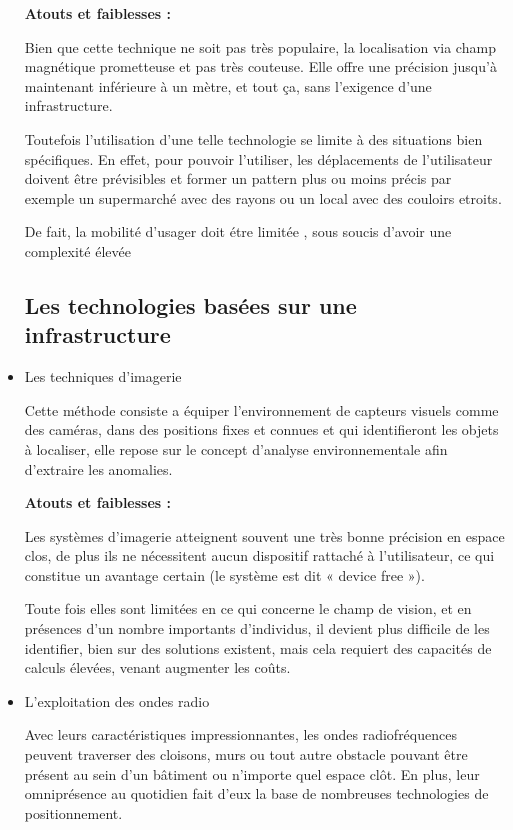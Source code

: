\documentclass[12pt,a4paper]{report}
\begin{document}
\begin{itemize}
 \textbf{Atouts et faiblesses :}


Bien que cette technique ne soit pas très populaire, la localisation via champ magnétique prometteuse et pas très couteuse. Elle offre une précision jusqu’à maintenant inférieure à un mètre, et tout ça, sans l’exigence d’une infrastructure. 

Toutefois l’utilisation d’une telle technologie se limite à des situations bien spécifiques. En effet, pour pouvoir l’utiliser, les déplacements de l’utilisateur doivent être prévisibles et former un pattern plus ou moins précis par exemple un supermarché avec des rayons ou un local avec des couloirs etroits.

De fait, la mobilité d'usager doit étre limitée , sous soucis d’avoir une complexité élevée
	


\subsection{Les technologies basées sur une infrastructure}

\item Les techniques d’imagerie

	Cette méthode consiste a équiper l’environnement de capteurs visuels comme des caméras,  dans des positions fixes et connues et qui identifieront les objets à localiser, elle repose sur le concept d’analyse environnementale afin d’extraire les anomalies. 

\textbf{Atouts et faiblesses :}

Les systèmes d’imagerie atteignent souvent une très bonne précision en espace clos, de plus ils ne nécessitent aucun dispositif rattaché à l’utilisateur, ce qui constitue un avantage certain (le système est dit « device free »).

Toute fois elles sont limitées en ce qui concerne le champ de vision, et en présences d’un nombre importants d’individus, il devient plus difficile de les identifier, bien sur  des solutions existent, mais cela requiert des capacités de calculs élevées, venant augmenter les coûts.

\item L’exploitation des ondes radio 

Avec leurs caractéristiques impressionnantes, les ondes radiofréquences peuvent traverser des cloisons, murs ou tout autre obstacle pouvant être présent au sein d’un bâtiment ou n’importe quel espace clôt. En plus, leur omniprésence au quotidien fait d’eux la base de nombreuses technologies de positionnement.


\end{itemize}
\end{document}
